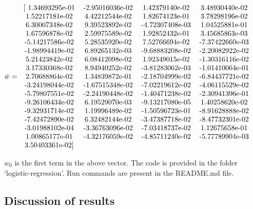 \documentclass[a4paper]{article}
\begin{document}
$\bar{w} =
	\begin{tabular}{  c c c c c c  } 
		[ 1.34693295e-01 & -2.95016036e-02 &  1.42379140e-02 &  3.48930440e-02 \\
		  1.52217181e-02 &  4.42212544e-02 &  1.82674123e-01 &  3.78298196e-02 \\
		  6.30007348e-02 &  9.39523892e-02 & -4.72307408e-03 &  1.04525881e-01 \\
		  1.67596878e-02 &  2.59975589e-02 &  1.92852432e-01 &  3.45685863e-03 \\
		 -5.14217586e-02 &  5.28535920e-02 &  7.52766694e-02 & -7.37422660e-03 \\
		 -1.98994419e-02 &  6.89265132e-03 & -9.68883208e-02 & -2.20082922e-02 \\
		  5.21423842e-02 &  6.08412098e-02 &  1.92349015e-02 & -1.30316116e-02 \\
		  3.17330368e-02 &  8.94940252e-02 & -3.81283062e-03 & -1.01410064e-01 \\
		  2.70688864e-02 &  1.34839872e-01 & -2.18704999e-02 & -6.84437721e-02 \\
		 -3.24198044e-02 & -1.67515348e-02 & -7.02219612e-02 & -4.06115529e-02 \\
		 -5.79807551e-02 & -2.24190448e-02 & -1.40471238e-02 & -2.30941396e-01 \\
		 -9.26106434e-02 &  6.19529070e-03 & -9.13217080e-05 &  1.40258620e-02 \\
		 -9.32931714e-02 &  1.19996489e-02 & -1.50596723e-01 & -8.91628888e-02 \\
		 -7.42472890e-02 &  6.32482144e-02 & -3.47387718e-02 & -8.47732301e-02 \\
		 -3.01988102e-04 & -3.36763096e-02 & -7.03418737e-02 &  1.12675658e-01 \\
		  1.00865177e-01 & -4.32176059e-02 & -4.85711240e-02 & -5.77789904e-03 \\
		  3.50403361e-02] & & & \\
	\end{tabular}$

\vspace{3mm}

$w_0$ is the first term in the above vector. The code is provided in the folder `logistic-regression'. Run commands are present in the README.md file.

\newpage

\subsection*{Discussion of results}
\end{document}
